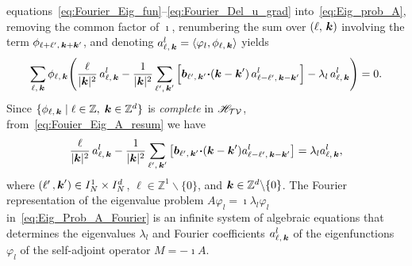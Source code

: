 \documentclass[amsa]{ipart}
\begin{document}
equations~\eqref{eq:Fourier_Eig_fun}--\eqref{eq:Fourier_Del_u_grad} 
into~\eqref{eq:Eig_prob_A}, removing the common factor of
$\imath$, renumbering the sum over $(\ell,\,\boldsymbol{k})$  involving the term
$\phi_{\ell+\ell^\prime,\,\boldsymbol{k}+\boldsymbol{k}^\prime}$, and denoting
$a^l_{\ell,\,\boldsymbol{k}}=\langle\varphi_l,\phi_{\ell,\,\boldsymbol{k}}\rangle$ yields 
%
\begin{align}\label{eq:Fouier_Eig_A_resum}
  \sum_{\ell,\,\veck}\phi_{\ell,\,\veck}
  \Bigg(
  \frac{\ell}{|\veck|^2}\,a^l_{\ell,\,\veck}
  -
   \frac{1}{|\veck|^2} \sum_{\ell^\prime,\,\veck^\prime}  
  \Big[
  \vecb_{\ell^\prime,\,\veck^\prime}\bcdot(\veck-\veck^\prime)\,
  a^l_{\ell-\ell^\prime,\,\veck-\veck^\prime}
  \Big]  
  -\lambda_l\,a^l_{\ell,\,\veck}
  \Bigg)=0.
\end{align}
%
Since $\{\phi_{\ell,\,\boldsymbol{k}} \;|\; \ell\in\mathbb{Z},\;\boldsymbol{k}\in\mathbb{Z}^d\}$ is 
\emph{complete} in $\mathscr{H}_{\mathcal{T}\mathcal{V}}$,
from~\eqref{eq:Fouier_Eig_A_resum} we
have~\cite{Folland:99:RealAnalysis}     
%
\begin{align}\label{eq:Eig_Prob_A_Fourier}
  \frac{\ell}{|\veck|^2}\,a^l_{\ell,\,\veck}
  -
   \frac{1}{|\veck|^2}
  \sum_{\ell^\prime,\,\veck^\prime}    
  \left[
    \vecb_{\ell^\prime,\,\veck^\prime}\bcdot(\veck-\veck^\prime)
    a^l_{\ell-\ell^\prime,\,\veck-\veck^\prime}
  \right] 
  =\lambda_la^l_{\ell,\,\veck},
\end{align}
%
where $(\ell^\prime\,,\boldsymbol{k}^\prime)\in I_N^1\times I_N^d$, $\ell\in\mathbb{Z}^1\backslash\{0\}$, and
$\boldsymbol{k}\in\mathbb{Z}^d\backslash\{0\}$. The Fourier representation
of the eigenvalue problem $A\varphi_l=\imath\lambda_l\varphi_l$
in~\eqref{eq:Eig_Prob_A_Fourier} is an infinite system of algebraic
equations that determines the eigenvalues $\lambda_l$ and Fourier
coefficients $a^l_{\ell,\,\boldsymbol{k}}$ of the eigenfunctions $\varphi_l$ of the
self-adjoint operator $M=-\imath A$. 
\end{document}
